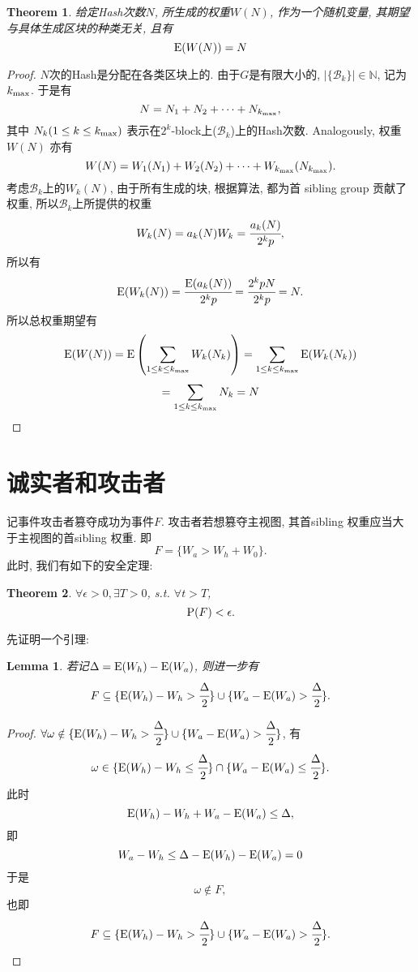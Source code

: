 \documentclass[UTF8]{ctexart}
\theoremstyle{definition}
\theoremstyle{plain}
\newtheorem{theorem}{Theorem}
\newtheorem{lemma}{Lemma}
\begin{document}
\begin{theorem}
    给定Hash次数$N$, 所生成的权重$W(N)$, 作为一个随机变量, 其期望与具体生成区块的种类无关, 且有
    \[ {\rm {E}}(W(N)) = N \]
\end{theorem}
\begin{proof}
    $N$次的Hash是分配在各类区块上的. 由于$G$是有限大小的, $|\{\mathcal{B}_k\}|\in \mathbb{N}$, 记为$k_{\rm max}$.
    于是有
    \[N = N_1 + N_2 + \dots + N_{k_{\rm max}},\] 其中 $N_k (1 \le k \le k_{\rm max})$ 表示在$2^k$-block上($\mathcal{B}_k$)上的Hash次数.
    Analogously, 权重$W(N)$ 亦有
    \[W(N) = W_1(N_1) + W_2(N_2) + \dots + W_{k_{\rm max}}(N_{k_{\rm max}}).\]
    考虑$\mathcal{B}_k$上的$W_k(N)$, 由于所有生成的块, 根据算法, 都为首 sibling group 贡献了权重, 所以$\mathcal{B}_k$上所提供的权重
    \[W_k(N) = a_k(N)W_k = \cfrac{a_k(N)}{2^k p},\]所以有
    \[{\rm E}(W_k(N))=\cfrac{{\rm E}(a_k(N))}{2^k p} = \cfrac{2^k p N}{2^k p} = N.\]
    所以总权重期望有
    \[ {\rm {E}}(W(N)) ={\rm {E}}\left(\sum_{1 \le k \le k_{\rm max}} W_k(N_k)\right) =\sum_{1 \le k \le k_{\rm max}} {\rm {E}}(W_k(N_k))\]
    \[= \sum_{1 \le k \le k_{\rm max}}N_k = N\]
\end{proof}

\section{诚实者和攻击者}
记事件攻击者篡夺成功为事件$F$. 攻击者若想篡夺主视图, 其首sibling 权重应当大于主视图的首sibling 权重. 
即\[F=\{W_a>W_h+W_0\}.\]
此时, 我们有如下的安全定理:
\begin{theorem}
    $\forall \epsilon>0, \exists T>0$, s.t. $\forall t>T$,
    \[{\rm P}(F) <\epsilon .\]
    \label{safethm}
\end{theorem}
先证明一个引理:
\begin{lemma}
    若记$\Delta = {\rm E}(W_h)-{\rm E}(W_a)$, 则进一步有
\[F\subseteq \{{\rm E}(W_h)-W_h>\cfrac{\Delta}{2}\} \cup \{W_a-{\rm E}(W_a)>\cfrac{\Delta}{2}\}.\]
\label{lem}
\end{lemma}

\begin{proof}
$\forall\omega\notin\{{\rm E}(W_h)-W_h>\cfrac{\Delta}{2}\} \cup \{W_a-{\rm E}(W_a)>\cfrac{\Delta}{2}\}$, 有
\[\omega\in \{{\rm E}(W_h)-W_h\le\cfrac{\Delta}{2}\} \cap \{W_a-{\rm E}(W_a)\le\cfrac{\Delta}{2}\}.\] 此时
\[{\rm E}(W_h)-W_h+W_a-{\rm E}(W_a)\le\Delta,\]即
\[W_a-W_h \le \Delta - {\rm E}(W_h)-{\rm E}(W_a)= 0 \]
于是\[\omega \notin F,\] 也即\[F \subseteq \{{\rm E}(W_h)-W_h>\cfrac{\Delta}{2}\} \cup \{W_a-{\rm E}(W_a)>\cfrac{\Delta}{2}\}.\]
\end{proof}
\end{document}
